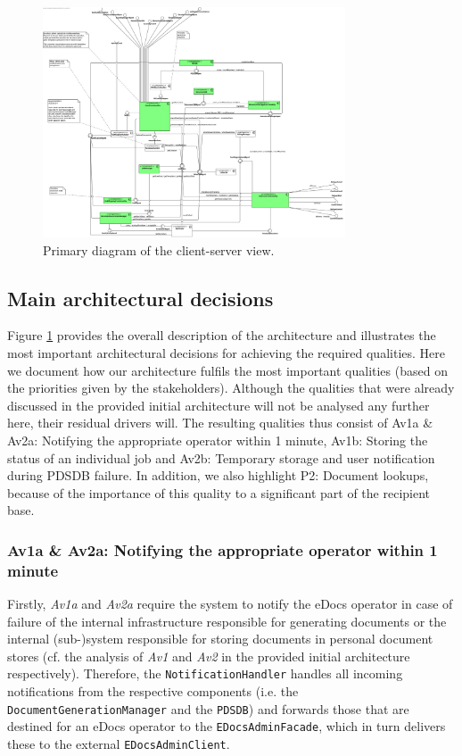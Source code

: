 \documentclass[a4paper,10pt]{article}
\begin{document}
\begin{figure}[!htp]
	\centering
	\includegraphics[width=0.8\textwidth]{ClientServerView.png}
	\caption{Primary diagram of the client-server view.}
	\label{fig:cs-primary}
\end{figure}
\FloatBarrier

\subsection{Main architectural decisions}
Figure \ref{fig:cs-primary} provides the overall description of the architecture and illustrates the most important architectural decisions for achieving the required qualities. Here we document how our architecture fulfils the most important qualities (based on the priorities given by the stakeholders). Although the qualities that were already discussed in the provided initial architecture will not be analysed any further here, their residual drivers will. The resulting qualities thus consist of Av1a \& Av2a: Notifying the appropriate operator within 1 minute, Av1b: Storing the status of an individual job and Av2b: Temporary storage and user notification during PDSDB failure. In addition, we also highlight P2: Document lookups, because of the importance of this quality to a significant part of the recipient base.

\subsubsection{Av1a \& Av2a: Notifying the appropriate operator within 1 minute}\label{subsubsec:Av1a-Av2a}
Firstly, \textit{Av1a} and \textit{Av2a} require the system to notify the eDocs operator in case of failure of the internal infrastructure responsible for generating documents or the internal (sub-)system responsible for storing documents in personal document stores (cf. the analysis of \textit{Av1} and \textit{Av2} in the provided initial architecture respectively). Therefore, the \texttt{NotificationHandler} handles all incoming notifications from the respective components (i.e. the \texttt{DocumentGenerationManager} and the \texttt{PDSDB}) and forwards those that are destined for an eDocs operator to the \texttt{EDocsAdminFacade}, which in turn delivers these to the external \texttt{EDocsAdminClient}.
\end{document}
